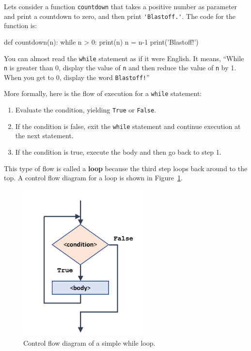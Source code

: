 Lets consider a function {\tt countdown} that takes a positive number as parameter
and print a countdown to zero, and then print \verb|'Blastoff.'|. The code for the
function is:

\beforeverb
\begin{pycode}
def countdown(n):
    while n > 0:
        print(n)
        n = n-1
    print('Blastoff!')
\end{pycode}
\afterverb
%
You can almost read the {\tt while} statement as if it were English.
It means, ``While {\tt n} is greater than 0,
display the value of {\tt n} and then reduce the value of
{\tt n} by 1.  When you get to 0, display the word {\tt Blastoff!}''


More formally, here is the flow of execution for a {\tt while} statement:

\begin{enumerate}

\item Evaluate the condition, yielding {\tt True} or {\tt False}.

\item If the condition is false, exit the {\tt while} statement
and continue execution at the next statement.

\item If the condition is true, execute the
body and then go back to step 1.

\end{enumerate}

This type of flow is called a {\bf loop} because the third step
loops back around to the top.  A control flow diagram for a loop is shown in Figure~\ref{fig:loop-diagram}.

\begin{figure}[htb]%
\begin{center}
\includegraphics[height=8cm]{figs/simple-loop-diagram.png}%
\caption{Control flow diagram of a simple while loop.}%
\label{fig:loop-diagram}%
\end{center}
\end{figure}


